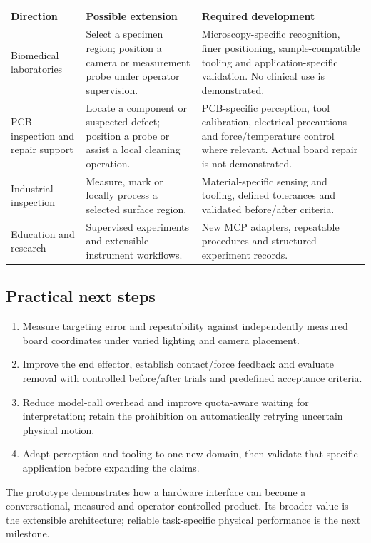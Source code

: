 \documentclass[10pt,a4paper]{article}
\begin{document}
\begin{tabularx}{\linewidth}{@{}>{\raggedright\arraybackslash}p{32mm}Y Y@{}}
\toprule
\textbf{Direction} & \textbf{Possible extension} & \textbf{Required development}\\\midrule
Biomedical laboratories & Select a specimen region; position a camera or measurement probe under operator supervision. & Microscopy-specific recognition, finer positioning, sample-compatible tooling and application-specific validation. No clinical use is demonstrated.\\
PCB inspection and repair support & Locate a component or suspected defect; position a probe or assist a local cleaning operation. & PCB-specific perception, tool calibration, electrical precautions and force/temperature control where relevant. Actual board repair is not demonstrated.\\
Industrial inspection & Measure, mark or locally process a selected surface region. & Material-specific sensing and tooling, defined tolerances and validated before/after criteria.\\
Education and research & Supervised experiments and extensible instrument workflows. & New MCP adapters, repeatable procedures and structured experiment records.\\
\bottomrule
\end{tabularx}

\subsection{Practical next steps}
\begin{enumerate}
\item Measure targeting error and repeatability against independently measured
board coordinates under varied lighting and camera placement.
\item Improve the end effector, establish contact/force feedback and evaluate
removal with controlled before/after trials and predefined acceptance criteria.
\item Reduce model-call overhead and improve quota-aware waiting for interpretation;
retain the prohibition on automatically retrying uncertain physical motion.
\item Adapt perception and tooling to one new domain, then validate that specific
application before expanding the claims.
\end{enumerate}

The prototype demonstrates how a hardware interface can become a conversational,
measured and operator-controlled product. Its broader value is the extensible
architecture; reliable task-specific physical performance is the next milestone.
\end{document}
